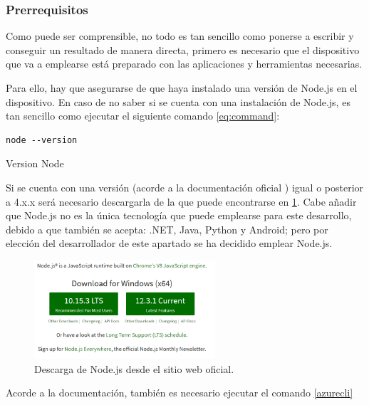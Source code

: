 \documentclass[english,runningheads,a4paper]{llncs}[2018/03/10]
\begin{document}
\subsubsection{Prerrequisitos}

Como puede ser comprensible, no todo es tan sencillo como ponerse a escribir y
conseguir un resultado de manera directa, primero es necesario que el
dispositivo que va a emplearse está preparado con las aplicaciones y
herramientas necesarias.

Para ello, hay que asegurarse de que haya instalado una versión de Node.js en el
dispositivo. En caso de no saber si se cuenta con una instalación de Node.js, es
 tan sencillo como ejecutar el siguiente comando
 \hyperref[eq:command]{\ref{eq:command}}:

\begin{listing}[htp]
\centering
    \begin{verbatim} 
node --version
    \end{verbatim}
\caption{Version Node}
\label{lst:command}
\end{listing}

Si se cuenta con una versión (acorde a la documentación oficial
\cite{azure_iot}) igual o posterior a 4.x.x será necesario descargarla de la
que puede encontrarse en \cite{node} 
\hyperref[downloadnode]{\ref{downloadnode}}. Cabe añadir que Node.js no es la 
única tecnología que puede emplearse para este desarrollo, debido a que también
se acepta: .NET, Java, Python y Android; pero por elección del desarrollador de
este apartado se ha decidido emplear Node.js.

\begin{figure}[h!]
 \centering
 \includegraphics[width=0.6\textwidth]{./IoT/MicrosoftAzure/4-3-1_send_simulated_telemetry.png}
 \caption{Descarga de Node.js desde el sitio web oficial.}
 \label{downloadnode}

\end{figure}

Acorde a la documentación, también es necesario ejecutar el comando
\hyperref[eq:azurecli]{\ref{azurecli}}
\end{document}
